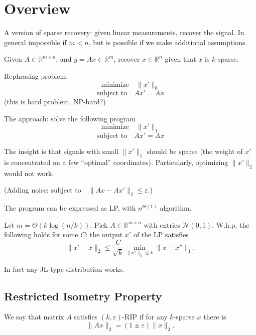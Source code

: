 \documentclass[11pt]{article}
\begin{document}


\section{Overview \cite{DBLP:conf/cdc/Vidyasagar16}}
A version of sparse recovery: given linear measurements, recover the signal. In general impossible if $m<n$, but is possible if we make additional assumptions.

\begin{definition}
Given $A \in \mathbb{R}^{m \times n}$, and $y = Ax \in \mathbb{R}^m$, recover $x \in \mathbb{R}^n$ given that $x$ is $k$-sparse.
\end{definition}

Rephrasing problem:
$$\text{minimize}\quad\|x'\|_0$$
$$\text{subject to}\quad Ax' = Ax$$
(this is hard problem, NP-hard?)

The approach: solve the following program
$$\text{minimize}\quad\|x'\|_1$$
$$\text{subject to}\quad Ax' = Ax$$

The insight is that signals with small  $\|x'\|_1$ should be sparse (the weight of $x'$ is concentrated on a few ``optimal'' coordinates). Particularly, optimizing $\|x'\|_2$ would not work.

(Adding noise: $\text{subject to}\quad \|Ax - Ax'\|_2 \le \varepsilon$.)

The program can be expressed as LP, with $n^{\Theta(1)}$ algorithm.


\begin{theorem}
Let $m = \Theta(k \log(n/k))$. Pick $A \in \mathbb{R}^{m \times n}$ with entries $\mathcal{N}(0,1)$. W.h.p. the following holds for some $C$: the output $x'$ of the LP satisfies
\begin{equation}
\label{eq:ref}
\|x'-x\|_2 \le \frac{C}{\sqrt{k}} \min_{\|x''\|_0 \le k} \|x - x''\|_1.
\end{equation}

In fact any JL-type distribution works.
\end{theorem}

\subsection{Restricted Isometry Property}

\begin{definition}
We say that matrix $A$ satisfies $(k,\varepsilon)$-RIP if for any $k$-sparse $x$ there is $$\|Ax \|_2 = (1\pm \varepsilon) \|x\|_2.$$
\end{definition}
\end{document}
